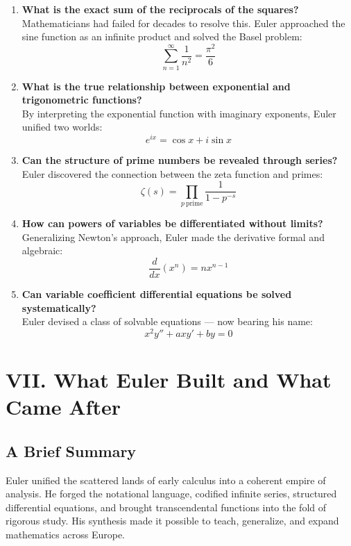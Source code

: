 \documentclass[9pt]{article}
\begin{document}
\begin{enumerate}
  \item \textbf{What is the exact sum of the reciprocals of the squares?}\\
  Mathematicians had failed for decades to resolve this. Euler approached the sine function as an infinite product and solved the Basel problem:
  \[ \sum_{n=1}^\infty \frac{1}{n^2} = \frac{\pi^2}{6} \]

  \item \textbf{What is the true relationship between exponential and trigonometric functions?}\\
  By interpreting the exponential function with imaginary exponents, Euler unified two worlds:
  \[ e^{ix} = \cos x + i\sin x \]

  \item \textbf{Can the structure of prime numbers be revealed through series?}\\
  Euler discovered the connection between the zeta function and primes:
  \[ \zeta(s) = \prod_{p\ \text{prime}} \frac{1}{1 - p^{-s}} \]

  \item \textbf{How can powers of variables be differentiated without limits?}\\
  Generalizing Newton’s approach, Euler made the derivative formal and algebraic:
  \[ \frac{d}{dx}(x^n) = nx^{n-1} \]

  \item \textbf{Can variable coefficient differential equations be solved systematically?}\\
  Euler devised a class of solvable equations — now bearing his name:
  \[ x^2y'' + axy' + by = 0 \]
\end{enumerate}

\newpage


\section*{VII. What Euler Built and What Came After}

\subsection*{A Brief Summary}

Euler unified the scattered lands of early calculus into a coherent empire of analysis. He forged the notational language, codified infinite series, structured differential equations, and brought transcendental functions into the fold of rigorous study. His synthesis made it possible to teach, generalize, and expand mathematics across Europe.
\end{document}
